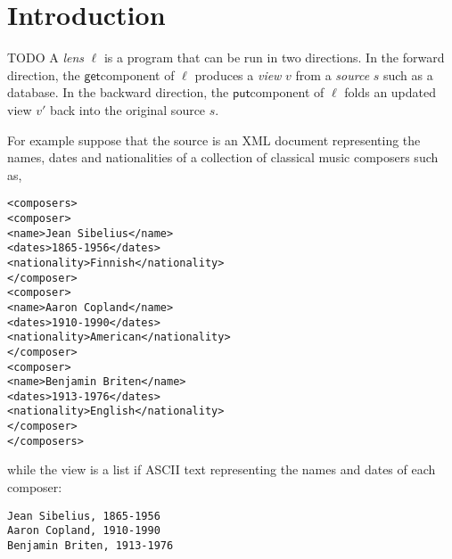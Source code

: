 \documentclass[acmsmall,review,anonymous]{acmart}\settopmatter{printfolios=true,printccs=false,printacmref=false}
\newcommand{\kw}[1]{\ensuremath{\mathsf{#1}}}
\newcommand{\get}{\ensuremath{\kw{get}}}
\newcommand{\pput}{\ensuremath{\kw{put}}}
\begin{document}


\maketitle

\section{Introduction}
TODO
\iffalse
A {\em lens} $\ell$ is a program that can be run in two directions. In the
forward direction, the \get component of $\ell$ produces a {\em view} $v$
from a {\em source} $s$ such as a database. In the backward direction,
the \pput component of $\ell$ folds an updated view $v'$ back into the
original source $s$.

For example suppose that the source is an XML document representing the
names, dates and nationalities of a collection of classical music
composers such as,

\begin{lstlisting}
<composers>
<composer>
<name>Jean Sibelius</name>
<dates>1865-1956</dates>
<nationality>Finnish</nationality>
</composer>
<composer>
<name>Aaron Copland</name>
<dates>1910-1990</dates>
<nationality>American</nationality>
</composer>
<composer>
<name>Benjamin Briten</name>
<dates>1913-1976</dates>
<nationality>English</nationality>
</composer>
</composers>
\end{lstlisting}

while the view is a list if ASCII text representing the names and dates of each
composer:
\begin{lstlisting}
Jean Sibelius, 1865-1956
Aaron Copland, 1910-1990
Benjamin Briten, 1913-1976
\end{lstlisting}
\end{document}
